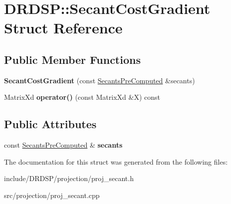 \hypertarget{struct_d_r_d_s_p_1_1_secant_cost_gradient}{\section{D\-R\-D\-S\-P\-:\-:Secant\-Cost\-Gradient Struct Reference}
\label{struct_d_r_d_s_p_1_1_secant_cost_gradient}
}
\subsection*{Public Member Functions}
\begin{DoxyCompactItemize}
\item 
\hypertarget{struct_d_r_d_s_p_1_1_secant_cost_gradient_a096f2c24858b19f95f773f8a5df6b97b}{{\bfseries Secant\-Cost\-Gradient} (const \hyperlink{struct_d_r_d_s_p_1_1_secants_pre_computed}{Secants\-Pre\-Computed} \&secants)}\label{struct_d_r_d_s_p_1_1_secant_cost_gradient_a096f2c24858b19f95f773f8a5df6b97b}

\item 
\hypertarget{struct_d_r_d_s_p_1_1_secant_cost_gradient_a2323e393882ab1cd60fb1bb61b587a92}{Matrix\-Xd {\bfseries operator()} (const Matrix\-Xd \&X) const }\label{struct_d_r_d_s_p_1_1_secant_cost_gradient_a2323e393882ab1cd60fb1bb61b587a92}

\end{DoxyCompactItemize}
\subsection*{Public Attributes}
\begin{DoxyCompactItemize}
\item 
\hypertarget{struct_d_r_d_s_p_1_1_secant_cost_gradient_ad2261f789984eff6b54376c9ff1c2867}{const \hyperlink{struct_d_r_d_s_p_1_1_secants_pre_computed}{Secants\-Pre\-Computed} \& {\bfseries secants}}\label{struct_d_r_d_s_p_1_1_secant_cost_gradient_ad2261f789984eff6b54376c9ff1c2867}

\end{DoxyCompactItemize}


The documentation for this struct was generated from the following files\-:\begin{DoxyCompactItemize}
\item 
include/\-D\-R\-D\-S\-P/projection/proj\-\_\-secant.\-h\item 
src/projection/proj\-\_\-secant.\-cpp\end{DoxyCompactItemize}
